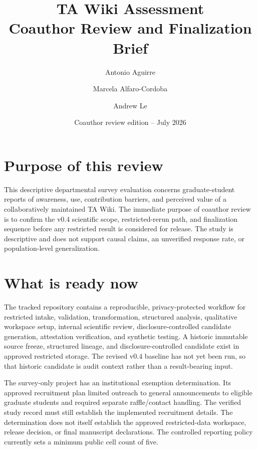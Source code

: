 \documentclass[11pt]{article}
\title{TA Wiki Assessment\\\large Coauthor Review and Finalization Brief}
\author{Antonio Aguirre \and Marcela Alfaro-Cordoba \and Andrew Le}
\date{Coauthor review edition -- July 2026}
\begin{document}
\raggedbottom
{}
\maketitle

\begin{center}
\end{center}

\section*{Purpose of this review}

This descriptive departmental survey evaluation concerns graduate-student reports of
awareness, use, contribution barriers, and perceived value of a collaboratively
maintained TA Wiki. The immediate purpose of coauthor review is to confirm the
v0.4 scientific scope, restricted-rerun path, and finalization sequence before
any restricted result is considered for release. The study is descriptive and
does not support causal claims, an unverified response rate, or population-level
generalization.

\section*{What is ready now}

The tracked repository contains a reproducible, privacy-protected workflow for
restricted intake, validation, transformation, structured analysis, qualitative
workspace setup, internal scientific review, disclosure-controlled candidate
generation, attestation
verification, and synthetic testing. A historic immutable source freeze,
structured lineage, and disclosure-controlled candidate exist in approved
restricted storage. The revised v0.4 baseline has not yet been run, so that
historic candidate is audit context rather than a result-bearing input.

The survey-only project has an institutional exemption determination. Its
approved recruitment plan limited outreach to general announcements to eligible
graduate students and required separate raffle/contact handling. The verified
study record must still establish the implemented recruitment details. The
determination does not itself establish the approved restricted-data workspace,
release decision, or final manuscript declarations. The controlled reporting
policy currently sets a minimum public cell count of five.
\end{document}
